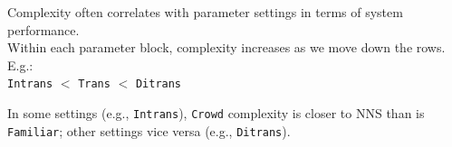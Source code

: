\documentclass[xcolor={dvipsnames}]{beamer}
\newcommand{\param}[1]{\texttt{#1}}
\begin{document}
\begin{frame}
\begin{columns}
\begin{column}{0.45\textwidth}  %

\pause
\vspace{-2em}

Complexity often correlates with parameter settings in terms of system performance. \\

\vspace{1em}
\pause
Within each parameter block, complexity increases as we move down the rows. E.g.: \\
\vspace{.5em}
\param{Intrans} $<$ \param{Trans} $<$ \param{Ditrans} \\
\vspace{1em}

\pause
In some settings (e.g., \param{Intrans}), \param{Crowd} complexity is closer to NNS than is \param{Familiar}; other settings vice versa (e.g., \param{Ditrans}). \\
 
\end{column}
\end{columns}

\end{frame}
\end{document}
